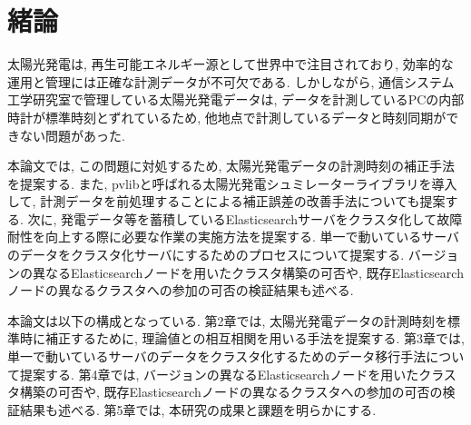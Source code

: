 \chapter{緒論}
\label{chap:first}

太陽光発電は, 再生可能エネルギー源として世界中で注目されており, 効率的な運用と管理には正確な計測データが不可欠である. しかしながら, 通信システム工学研究室で管理している太陽光発電データは, データを計測しているPCの内部時計が標準時刻とずれているため, 他地点で計測しているデータと時刻同期ができない問題があった.

本論文では, この問題に対処するため, 太陽光発電データの計測時刻の補正手法を提案する. また, pvlibと呼ばれる太陽光発電シュミレーターライブラリを導入して, 計測データを前処理することによる補正誤差の改善手法についても提案する.
次に, 発電データ等を蓄積しているElasticsearchサーバをクラスタ化して故障耐性を向上する際に必要な作業の実施方法を提案する. 単一で動いているサーバのデータをクラスタ化サーバにするためのプロセスについて提案する. バージョンの異なるElasticsearchノードを用いたクラスタ構築の可否や, 既存Elasticsearchノードの異なるクラスタへの参加の可否の検証結果も述べる. 

本論文は以下の構成となっている. 第2章では, 太陽光発電データの計測時刻を標準時に補正するために, 理論値との相互相関を用いる手法を提案する. 第3章では, 単一で動いているサーバのデータをクラスタ化するためのデータ移行手法について提案する. 第4章では, バージョンの異なるElasticsearchノードを用いたクラスタ構築の可否や, 既存Elasticsearchノードの異なるクラスタへの参加の可否の検証結果も述べる. 第5章では, 本研究の成果と課題を明らかにする.